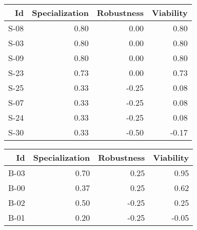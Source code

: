 


\begin{tabular}{ | r | r | r | r | }
    \hline
                    Id  &  Specialization  &      Robustness  &       Viability  \\
    \hline
    \hline
                  S-08  &            0.80  &            0.00  &            0.80  \\
    \hline
                  S-03  &            0.80  &            0.00  &            0.80  \\
    \hline
                  S-09  &            0.80  &            0.00  &            0.80  \\
    \hline
                  S-23  &            0.73  &            0.00  &            0.73  \\
    \hline
                  S-25  &            0.33  &           -0.25  &            0.08  \\
    \hline
                  S-07  &            0.33  &           -0.25  &            0.08  \\
    \hline
                  S-24  &            0.33  &           -0.25  &            0.08  \\
    \hline
                  S-30  &            0.33  &           -0.50  &           -0.17  \\
    \hline
\end{tabular}


\begin{tabular}{ | r | r | r | r | }
    \hline
                    Id  &  Specialization  &      Robustness  &       Viability  \\
    \hline
    \hline
                  B-03  &            0.70  &            0.25  &            0.95  \\
    \hline
                  B-00  &            0.37  &            0.25  &            0.62  \\
    \hline
                  B-02  &            0.50  &           -0.25  &            0.25  \\
    \hline
                  B-01  &            0.20  &           -0.25  &           -0.05  \\
    \hline
\end{tabular}


